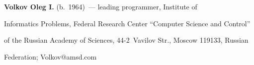   


  \noindent


  \textbf{Volkov Oleg I.} (b.\ 1964)~--- leading programmer, Institute of 


Informatics Problems, Federal Research Center ``Computer Science and Control'' 


of the Russian Academy of Sciences, 44-2~Vavilov Str., Moscow 119133, Russian 


Federation; \mbox{Volkov@amsd.com}





  


\label{end\stat}





\renewcommand{\bibname}{\protect\rm Литература} 


